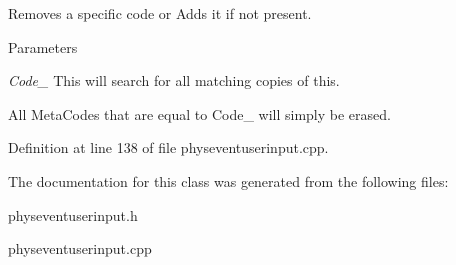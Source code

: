Removes a specific code or Adds it if not present. 
\begin{DoxyParams}{Parameters}
\item[{\em Code\_\-}]This will search for all matching copies of this.\end{DoxyParams}
All MetaCodes that are equal to Code\_\- will simply be erased. 

Definition at line 138 of file physeventuserinput.cpp.

The documentation for this class was generated from the following files:\begin{DoxyCompactItemize}
\item 
physeventuserinput.h\item 
physeventuserinput.cpp\end{DoxyCompactItemize}
